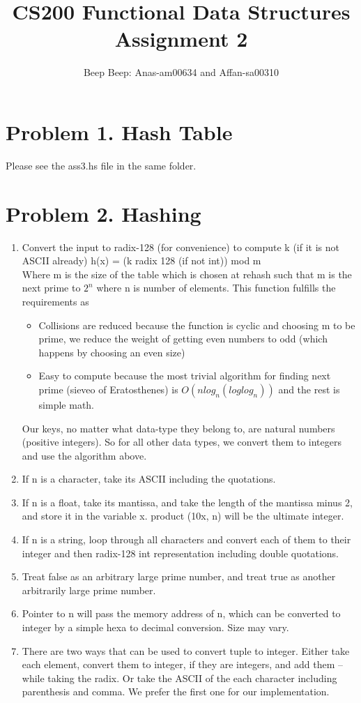 \documentclass{article}
\title{CS200 Functional Data Structures\\Assignment 2}
\author{Beep Beep: Anas-am00634 and Affan-sa00310}
\begin{document}
\maketitle
\section*{Problem 1. Hash Table}
	Please see the ass3.hs file in the same folder.
\section*{Problem 2. Hashing}
\begin{enumerate}
		\item Convert the input to radix-128 (for convenience) to compute k (if it is not ASCII already) 
	h(x) = (k radix 128 (if not int)) mod m\\ Where m is the size  of the table which is chosen at rehash such that m is the next prime to $2^n$ where n is number of elements.
		This function fulfills the requirements as
		\begin{itemize}
		\item Collisions are reduced because the function is cyclic and choosing m to be prime, we reduce the weight of getting even numbers to odd (which happens by choosing an even size)
		\item Easy to compute because the most trivial algorithm for finding next prime (sieveo of Eratosthenes) is $O(n log_n (log log_n))$ and the rest is simple math.

		\end{itemize}
		
	Our keys, no matter what data-type they belong to, are natural numbers (positive integers). So for all other data types, we convert them to integers and use the algorithm above. 
	\item	If n is a character, take its ASCII including the quotations.
	\item	If n is a float, take its mantissa, and take the length of the mantissa minus 2, and store it in the variable x. product (10x, n) will be the ultimate integer. 
	\item	If n is a string, loop through all characters and convert each of them to their integer and then radix-128 int representation including double quotations.
	\item	Treat false as an arbitrary large prime number, and treat true as another arbitrarily large prime number.
	\item	Pointer to n will pass the memory address of n, which can be converted to integer by a simple hexa to decimal conversion. Size may vary. 
	\item	There are two ways that can be used to convert tuple to integer. Either take each element, convert them to integer, if they are integers, and add them – while taking the radix. Or take the ASCII of the each character including parenthesis and comma. We prefer the first one for our implementation.
	
	\end{enumerate}
	
\end{document}
